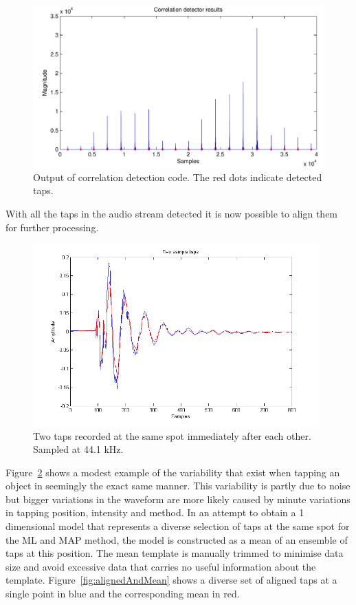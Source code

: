 \begin{figure}[!]
\centering
\includegraphics[width=150mm]{correlationDetect.pdf}
\caption{Output of correlation detection code. The red dots indicate detected taps.}\label{fig:correlationDetect}
\end{figure}

With all the taps in the audio stream detected it is now possible to align them for further processing.

\begin{figure}[!]
\centering
\includegraphics[width=110mm]{twoSampleTaps.png}
\caption{Two taps recorded at the same spot immediately after each other. Sampled at 44.1 kHz.}\label{fig:twoSampleTaps}
\end{figure}

Figure~\ref{fig:twoSampleTaps} shows a modest example of the variability that exist when tapping an object in seemingly the exact same manner. This variability is partly due to noise but bigger variations in the waveform are more likely caused by minute variations in tapping position, intensity and method. In an attempt to obtain a 1 dimensional model that represents a diverse selection of taps at the same spot for the ML and MAP method, the model is constructed as a mean of an ensemble of taps at this position. The mean template is manually trimmed to minimise data size and avoid excessive data that carries no useful information about the template. Figure~\ref{fig:alignedAndMean} shows a diverse set of aligned taps at a single point in blue and the corresponding mean in red.

